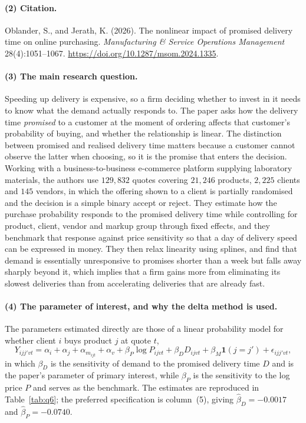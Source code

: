 \documentclass[11pt]{article}
\begin{document}
\paragraph{(2) Citation.}
Oblander, S., and Jerath, K. (2026). The nonlinear impact of promised delivery
time on online purchasing. \emph{Manufacturing \& Service Operations
Management} 28(4):1051--1067. \url{https://doi.org/10.1287/msom.2024.1335}.

\paragraph{(3) The main research question.}
Speeding up delivery is expensive, so a firm deciding whether to invest in it
needs to know what the demand actually responds to. The paper asks how the
delivery time \emph{promised} to a customer at the moment of ordering affects
that customer's probability of buying, and whether the relationship is linear.
The distinction between promised and realised delivery time matters because a
customer cannot observe the latter when choosing, so it is the promise that
enters the decision. Working with a business-to-business e-commerce platform
supplying laboratory materials, the authors use $129{,}832$ quotes covering
$21{,}246$ products, $2{,}225$ clients and $145$ vendors, in which the offering
shown to a client is partially randomised and the decision is a simple binary
accept or reject. They estimate how the purchase probability responds to the
promised delivery time while controlling for product, client, vendor and markup
group through fixed effects, and they benchmark that response against price
sensitivity so that a day of delivery speed can be expressed in money. They
then relax linearity using splines, and find that demand is essentially
unresponsive to promises shorter than a week but falls away sharply beyond it,
which implies that a firm gains more from eliminating its slowest deliveries
than from accelerating deliveries that are already fast.

\paragraph{(4) The parameter of interest, and why the delta method is used.}
The parameters estimated directly are those of a linear probability model for
whether client $i$ buys product $j$ at quote $t$,
\[
Y_{ijj'vt} = \alpha_i + \alpha_j + \alpha_{m_{ijt}} + \alpha_v
 + \beta_P \log P_{ijvt} + \beta_D D_{ijvt}
 + \beta_M \mathbf{1}(j = j') + \epsilon_{ijj'vt},
\]
in which $\beta_D$ is the sensitivity of demand to the promised delivery time
$D$ and is the paper's parameter of primary interest, while $\beta_P$ is the
sensitivity to the log price $P$ and serves as the benchmark. The estimates are
reproduced in Table~\ref{tab:q6}; the preferred specification is column~(5),
giving $\hat\beta_D = -0.0017$ and $\hat\beta_P = -0.0740$.
\end{document}
